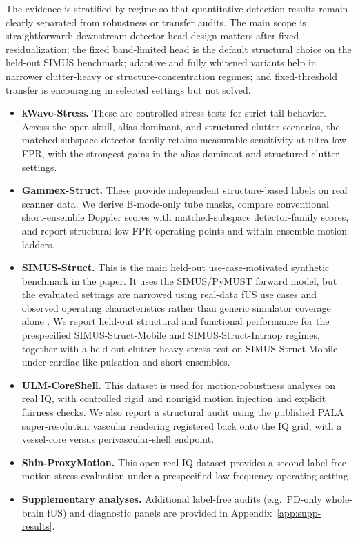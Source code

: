 \documentclass[11pt]{article}
\newif\ifSTAPPAPERONLY
\newcommand{\SuppOrApp}[1]{\ifSTAPPAPERONLY Supplementary Material\else Appendix~\ref{#1}\fi}
\begin{document}
The evidence is stratified by regime so that quantitative detection results remain clearly separated from robustness or transfer audits. The main scope is straightforward: downstream detector-head design matters after fixed residualization; the fixed band-limited head is the default structural choice on the held-out SIMUS benchmark; adaptive and fully whitened variants help in narrower clutter-heavy or structure-concentration regimes; and fixed-threshold transfer is encouraging in selected settings but not solved.

\begin{itemize}[nosep]
  \item \textbf{kWave-Stress.} These are controlled stress tests for strict-tail behavior. Across the open-skull, alias-dominant, and structured-clutter scenarios, the matched-subspace detector family retains measurable sensitivity at ultra-low FPR, with the strongest gains in the alias-dominant and structured-clutter settings.
  \item \textbf{Gammex-Struct.} These provide independent structure-based labels on real scanner data. We derive B-mode-only tube masks, compare conventional short-ensemble Doppler scores with matched-subspace detector-family scores, and report structural low-FPR operating points and within-ensemble motion ladders.
  \item \textbf{SIMUS-Struct.} This is the main held-out use-case-motivated synthetic benchmark in the paper. It uses the SIMUS/PyMUST forward model, but the evaluated settings are narrowed using real-data fUS use cases and observed operating characteristics rather than generic simulator coverage alone \cite{GarciaSIMUSPartI2022,CigierSIMUSPartII2022,UrbanWholeBrain2015,Deffieux2021,Soloukey2020FUSAwake,Rabut2024}. We report held-out structural and functional performance for the prespecified SIMUS-Struct-Mobile and SIMUS-Struct-Intraop regimes, together with a held-out clutter-heavy stress test on SIMUS-Struct-Mobile under cardiac-like pulsation and short ensembles.
  \item \textbf{ULM-CoreShell.} This dataset is used for motion-robustness analyses on real IQ, with controlled rigid and nonrigid motion injection and explicit fairness checks. We also report a structural audit using the published PALA super-resolution vascular rendering registered back onto the IQ grid, with a vessel-core versus perivascular-shell endpoint.
  \item \textbf{Shin-ProxyMotion.} This open real-IQ dataset provides a second label-free motion-stress evaluation under a prespecified low-frequency operating setting.
  \item \textbf{Supplementary analyses.} Additional label-free audits (e.g.\ PD-only whole-brain fUS) and diagnostic panels are provided in \SuppOrApp{app:supp-results}.
\end{itemize}
\end{document}
